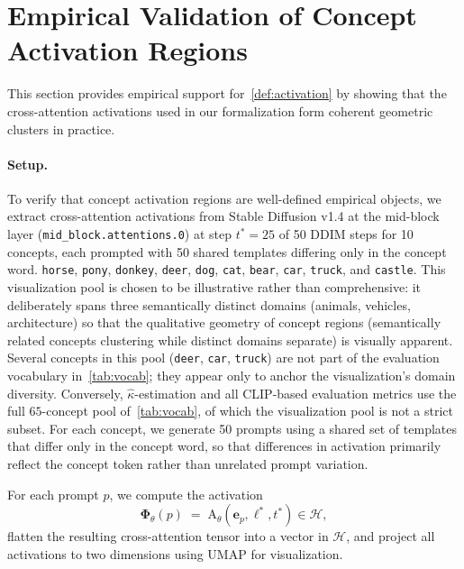 \section{Empirical Validation of Concept Activation Regions}
\label{app:activation_regions}
This section provides empirical support for~\cref{def:activation} by showing that the cross-attention activations used in our formalization form coherent geometric clusters in practice.
\paragraph{Setup.}
To verify that concept activation regions are well-defined empirical objects, we extract cross-attention activations from Stable Diffusion v1.4 at the mid-block layer (\texttt{mid\_block.attentions.0}) at step $t^*{=}25$ of 50 DDIM steps for 10 concepts, each prompted with 50 shared templates differing only in the concept word.
\texttt{horse}, \texttt{pony}, \texttt{donkey}, \texttt{deer}, \texttt{dog}, \texttt{cat}, \texttt{bear}, \texttt{car}, \texttt{truck}, and \texttt{castle}.
This visualization pool is chosen to be illustrative rather than comprehensive: it deliberately spans three semantically distinct domains (animals, vehicles, architecture) so that the qualitative geometry of concept regions (semantically related concepts clustering while distinct domains separate) is visually apparent. Several concepts in this pool (\texttt{deer}, \texttt{car}, \texttt{truck}) are not part of the evaluation vocabulary in~\cref{tab:vocab}; they appear only to anchor the visualization's domain diversity. Conversely, $\hat\kappa$-estimation and all CLIP-based evaluation metrics use the full $65$-concept pool of~\cref{tab:vocab}, of which the visualization pool is not a strict subset.
For each concept, we generate 50 prompts using a shared set of templates that differ only in the concept word, so that differences in activation primarily reflect the concept token rather than unrelated prompt variation.

For each prompt $p$, we compute the activation
\begin{equation}
    \boldsymbol{\Phi}_{\theta}(p) \;=\; \mathrm{A}_{\theta}(\mathbf{e}_p,\ell^*,t^*) \in \mathcal{H},
\end{equation}
flatten the resulting cross-attention tensor into a vector in $\mathcal{H}$, and project all activations to two dimensions using UMAP for visualization.

